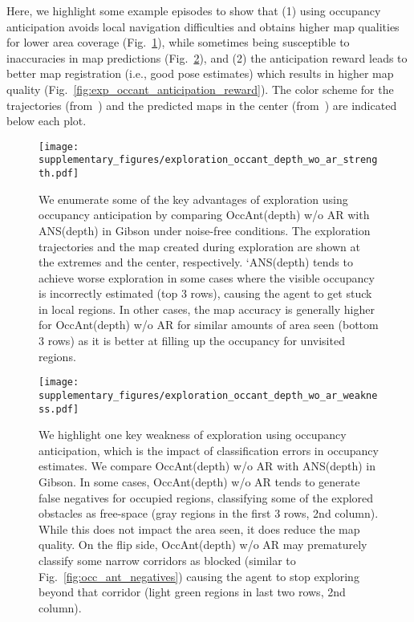 \documentclass[runningheads]{llncs}
\begin{document}
Here, we highlight some example episodes to show that (1) using occupancy anticipation avoids local navigation difficulties and obtains higher map qualities for lower area coverage (Fig.~\ref{fig:exp_occant_depth_strengths}), while sometimes being susceptible to inaccuracies in map predictions (Fig.~\ref{fig:exp_occant_depth_weaknesses}), and (2) the anticipation reward leads to better map registration (i.e., good pose estimates) which results in higher map quality (Fig.~\ref{fig:exp_occant_anticipation_reward}). The  color scheme for the trajectories (from~\cite{habitat19iccv}) and the predicted maps in the center (from~\cite{chaplot2020learning}) are indicated below each plot.

\begin{figure}
    \centering
    \texttt{[image: supplementary\_figures/exploration\_occant\_depth\_wo\_ar\_strength.pdf]}
    \caption{\small We enumerate some of the key advantages of exploration using occupancy anticipation by comparing OccAnt(depth) w/o AR with ANS(depth) in Gibson under noise-free conditions. The exploration trajectories and the map created during exploration are shown at the extremes and the center, respectively. `ANS(depth) tends to achieve worse exploration in some cases where the visible occupancy is incorrectly estimated (top 3 rows), causing the agent to get stuck in local regions. In other cases, the map accuracy is generally higher for OccAnt(depth) w/o AR for similar amounts of area seen (bottom 3 rows) as it is better at filling up the occupancy for unvisited regions. }
    \label{fig:exp_occant_depth_strengths}
\end{figure}


\begin{figure}
    \centering
    \texttt{[image: supplementary\_figures/exploration\_occant\_depth\_wo\_ar\_weakness.pdf]}
    \caption{\small We highlight one key weakness of exploration using occupancy anticipation, which is the impact of classification errors in occupancy estimates. We compare OccAnt(depth) w/o AR with ANS(depth) in Gibson. In some cases, OccAnt(depth) w/o AR tends to generate false negatives for occupied regions, classifying some of the explored obstacles as free-space (gray regions in the first 3 rows, 2nd column). While this does not impact the area seen, it does reduce the map quality. On the flip side, OccAnt(depth) w/o AR may prematurely classify some narrow corridors as blocked (similar to Fig.~\ref{fig:occ_ant_negatives}) causing the agent to stop exploring beyond that corridor (light green regions in last two rows, 2nd column). }
    \label{fig:exp_occant_depth_weaknesses}
\end{figure}
\end{document}
